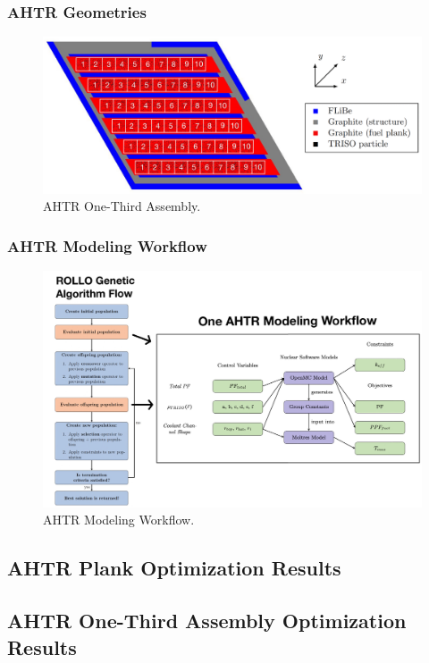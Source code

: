 \begin{frame}
    \frametitle{AHTR Geometries}
    \begin{figure}
        \includegraphics[width=0.9\linewidth]{figures/ahtr-assembly-pres.png} 
        \caption{AHTR One-Third Assembly.}
    \end{figure}
\end{frame}

\begin{frame}
    \frametitle{AHTR Modeling Workflow}
    \begin{figure}
        \includegraphics[width=0.9\linewidth]{figures/ahtr-modeling-workflow.png} 
        \caption{AHTR Modeling Workflow.}
    \end{figure}
\end{frame}

\subsection{AHTR Plank Optimization Results}

\subsection{AHTR One-Third Assembly Optimization Results}